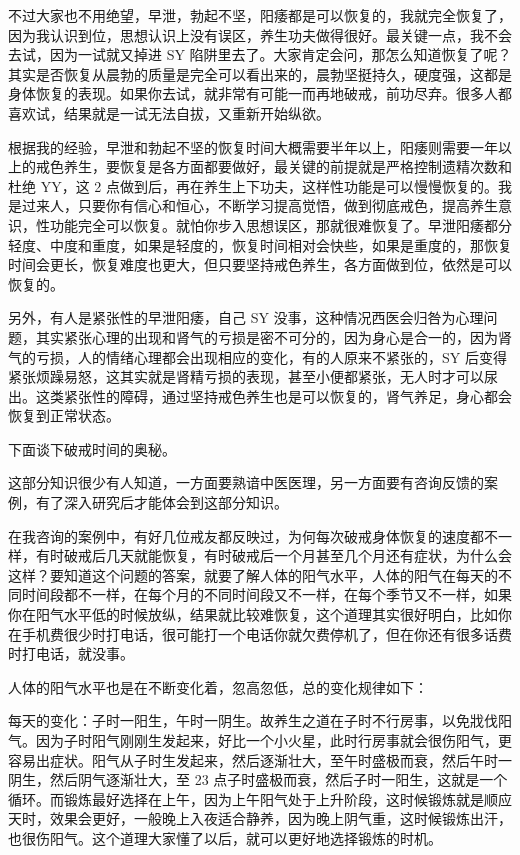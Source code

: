 \documentclass[fontset=founder]{ctexart}
\begin{document}
不过大家也不用绝望，早泄，勃起不坚，阳痿都是可以恢复的，我就完全恢复了，因为我认识到位，思想认识上没有误区，养生功夫做得很好。最关键一点，我不会去试，因为一试就又掉进 SY 陷阱里去了。大家肯定会问，那怎么知道恢复了呢？其实是否恢复从晨勃的质量是完全可以看出来的，晨勃坚挺持久，硬度强，这都是身体恢复的表现。如果你去试，就非常有可能一而再地破戒，前功尽弃。很多人都喜欢试，结果就是一试无法自拔，又重新开始纵欲。

根据我的经验，早泄和勃起不坚的恢复时间大概需要半年以上，阳痿则需要一年以上的戒色养生，要恢复是各方面都要做好，最关键的前提就是严格控制遗精次数和杜绝 YY，这 2 点做到后，再在养生上下功夫，这样性功能是可以慢慢恢复的。我是过来人，只要你有信心和恒心，不断学习提高觉悟，做到彻底戒色，提高养生意识，性功能完全可以恢复。就怕你步入思想误区，那就很难恢复了。早泄阳痿都分轻度、中度和重度，如果是轻度的，恢复时间相对会快些，如果是重度的，那恢复时间会更长，恢复难度也更大，但只要坚持戒色养生，各方面做到位，依然是可以恢复的。

另外，有人是紧张性的早泄阳痿，自己 SY 没事，这种情况西医会归咎为心理问题，其实紧张心理的出现和肾气的亏损是密不可分的，因为身心是合一的，因为肾气的亏损，人的情绪心理都会出现相应的变化，有的人原来不紧张的，SY 后变得紧张烦躁易怒，这其实就是肾精亏损的表现，甚至小便都紧张，无人时才可以尿出。这类紧张性的障碍，通过坚持戒色养生也是可以恢复的，肾气养足，身心都会恢复到正常状态。

下面谈下破戒时间的奥秘。

这部分知识很少有人知道，一方面要熟谙中医医理，另一方面要有咨询反馈的案例，有了深入研究后才能体会到这部分知识。

在我咨询的案例中，有好几位戒友都反映过，为何每次破戒身体恢复的速度都不一样，有时破戒后几天就能恢复，有时破戒后一个月甚至几个月还有症状，为什么会这样？要知道这个问题的答案，就要了解人体的阳气水平，人体的阳气在每天的不同时间段都不一样，在每个月的不同时间段又不一样，在每个季节又不一样，如果你在阳气水平低的时候放纵，结果就比较难恢复，这个道理其实很好明白，比如你在手机费很少时打电话，很可能打一个电话你就欠费停机了，但在你还有很多话费时打电话，就没事。

人体的阳气水平也是在不断变化着，忽高忽低，总的变化规律如下：

每天的变化：子时一阳生，午时一阴生。故养生之道在子时不行房事，以免戕伐阳气。因为子时阳气刚刚生发起来，好比一个小火星，此时行房事就会很伤阳气，更容易出症状。阳气从子时生发起来，然后逐渐壮大，至午时盛极而衰，然后午时一阴生，然后阴气逐渐壮大，至 23 点子时盛极而衰，然后子时一阳生，这就是一个循环。而锻炼最好选择在上午，因为上午阳气处于上升阶段，这时候锻炼就是顺应天时，效果会更好，一般晚上入夜适合静养，因为晚上阴气重，这时候锻炼出汗，也很伤阳气。这个道理大家懂了以后，就可以更好地选择锻炼的时机。
\end{document}
